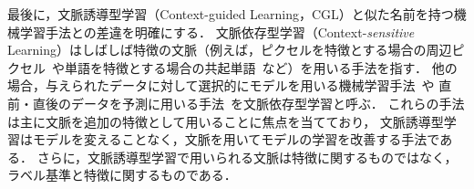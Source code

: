最後に，文脈誘導型学習（Context-guided Learning，CGL）と似た名前を持つ機械学習手法との差違を明確にする．
文脈依存型学習（Context-{\it sensitive} Learning）はしばしば特徴の文脈（例えば，ピクセルを特徴とする場合の周辺ピクセル~\cite{bovolo2006novel}や単語を特徴とする場合の共起単語~\cite{cohen1999context}など）を用いる手法を指す．
他の場合，与えられたデータに対して選択的にモデルを用いる機械学習手法~\cite{qi2002context}や
直前・直後のデータを予測に用いる手法~\cite{metallinou2012context}を文脈依存型学習と呼ぶ．
これらの手法は主に文脈を追加の特徴として用いることに焦点を当てており，
文脈誘導型学習はモデルを変えることなく，文脈を用いてモデルの学習を改善する手法である．
さらに，文脈誘導型学習で用いられる文脈は特徴に関するものではなく，
ラベル基準と特徴に関するものである．